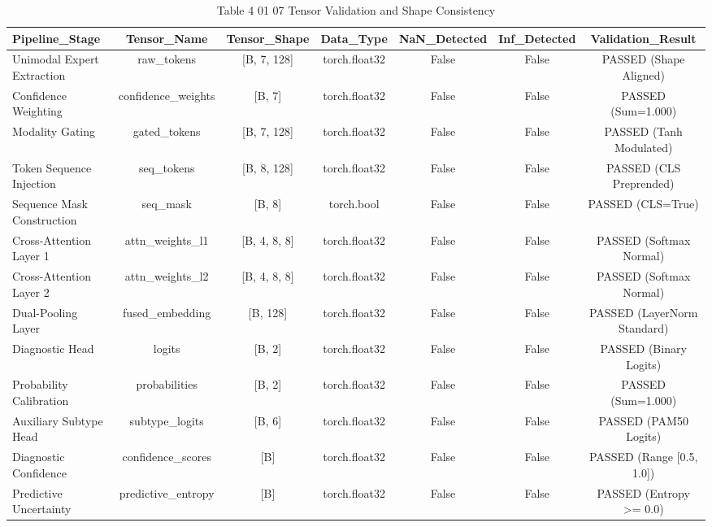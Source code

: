 \begin{table}[htbp]
\centering
\small
\begin{tabular}{lcccccc}
\hline
Pipeline\_Stage & Tensor\_Name & Tensor\_Shape & Data\_Type & NaN\_Detected & Inf\_Detected & Validation\_Result \\
\hline
Unimodal Expert Extraction & raw\_tokens & [B, 7, 128] & torch.float32 & False & False & PASSED (Shape Aligned) \\
Confidence Weighting & confidence\_weights & [B, 7] & torch.float32 & False & False & PASSED (Sum=1.000) \\
Modality Gating & gated\_tokens & [B, 7, 128] & torch.float32 & False & False & PASSED (Tanh Modulated) \\
Token Sequence Injection & seq\_tokens & [B, 8, 128] & torch.float32 & False & False & PASSED (CLS Preprended) \\
Sequence Mask Construction & seq\_mask & [B, 8] & torch.bool & False & False & PASSED (CLS=True) \\
Cross-Attention Layer 1 & attn\_weights\_l1 & [B, 4, 8, 8] & torch.float32 & False & False & PASSED (Softmax Normal) \\
Cross-Attention Layer 2 & attn\_weights\_l2 & [B, 4, 8, 8] & torch.float32 & False & False & PASSED (Softmax Normal) \\
Dual-Pooling Layer & fused\_embedding & [B, 128] & torch.float32 & False & False & PASSED (LayerNorm Standard) \\
Diagnostic Head & logits & [B, 2] & torch.float32 & False & False & PASSED (Binary Logits) \\
Probability Calibration & probabilities & [B, 2] & torch.float32 & False & False & PASSED (Sum=1.000) \\
Auxiliary Subtype Head & subtype\_logits & [B, 6] & torch.float32 & False & False & PASSED (PAM50 Logits) \\
Diagnostic Confidence & confidence\_scores & [B] & torch.float32 & False & False & PASSED (Range [0.5, 1.0]) \\
Predictive Uncertainty & predictive\_entropy & [B] & torch.float32 & False & False & PASSED (Entropy >= 0.0) \\
\hline
\end{tabular}
\caption{Table 4 01 07 Tensor Validation and Shape Consistency}
\label{tab:table_4_01_07_tensor_validation_and_shape_consistency}
\end{table}
